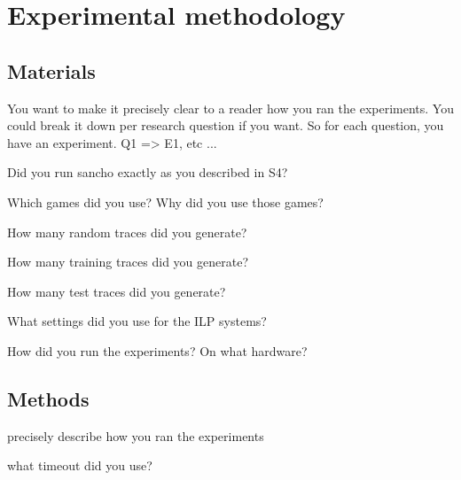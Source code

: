 \chapter{Experimental methodology}


\section{Materials}

\ac{
    You want to make it precisely clear to a reader how you ran the experiments.
    You could break it down per research question if you want.
    So for each question, you have an experiment.
    Q1 => E1, etc ...
}

\ac{Did you run sancho exactly as you described in S4?}

\ac{Which games did you use? Why did you use those games?}

\ac{How many random traces did you generate?}

\ac{How many training traces did you generate?}

\ac{How many test traces did you generate?}

\ac{What settings did you use for the ILP systems?}

\ac{How did you run the experiments? On what hardware?}



\section{Methods}

\ac{precisely describe how you ran the experiments}

\ac{what timeout did you use?}
